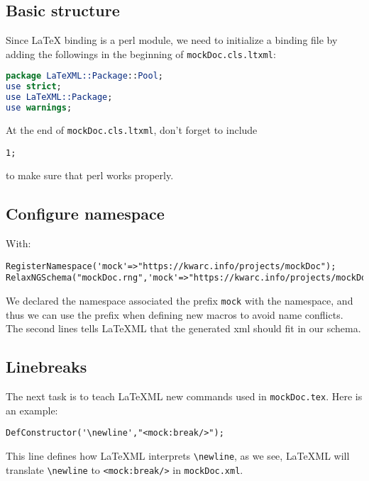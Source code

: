 \documentclass[a4paper]{article}
\def\latexml{{\LaTeX}ML\xspace}
\begin{document}
\subsection{Basic structure}
Since {\LaTeX} binding is a perl module, we need to initialize a binding file by adding
the followings in the beginning of \lstinline|mockDoc.cls.ltxml|:
\begin{lstlisting}[language=Perl]
package LaTeXML::Package::Pool;
use strict;
use LaTeXML::Package;
use warnings;
\end{lstlisting}
At the end of \lstinline|mockDoc.cls.ltxml|, don't forget to include
\begin{lstlisting}
1;
\end{lstlisting}
to make sure that perl works properly.

\subsection{Configure namespace}
 With:
\begin{lstlisting}
RegisterNamespace('mock'=>"https://kwarc.info/projects/mockDoc");
RelaxNGSchema("mockDoc.rng",'mock'=>"https://kwarc.info/projects/mockDoc");
\end{lstlisting}
 We declared the namespace associated the prefix \lstinline|mock| with the
 namespace, and thus we can use the prefix when defining new macros to avoid 
 name conflicts. The second lines tells \latexml that the generated xml should fit in our
 schema.

\subsection{Linebreaks}
The next task is to teach \latexml new commands used in \lstinline|mockDoc.tex|. Here is
an example:
\begin{lstlisting}
DefConstructor('\newline',"<mock:break/>");
\end{lstlisting}

This line defines how \latexml interprets \lstinline|\newline|, as we see,
\latexml will translate \lstinline|\newline| to \lstinline|<mock:break/>| in
\lstinline|mockDoc.xml|.
\end{document}
